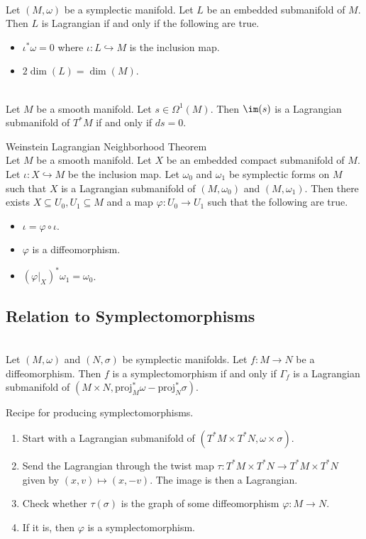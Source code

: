 \documentclass[a4paper]{article}
\begin{document}
\begin{lmm}{}{}\\
Let $(M,\omega)$ be a symplectic manifold. Let $L$ be an embedded submanifold of $M$. Then $L$ is Lagrangian if and only if the following are true. 
\begin{itemize}
\item $\iota^\ast\omega=0$ where $\iota:L\hookrightarrow M$ is the inclusion map. 
\item $2\dim(L)=\dim(M)$. 
\end{itemize}
\end{lmm}

\begin{prp}{}{}\\
Let $M$ be a smooth manifold. Let $s\in\Omega^1(M)$. Then $\im(s)$ is a Lagrangian submanifold of $T^\ast M$ if and only if $ds=0$. 
\end{prp}

\begin{thm}{Weinstein Lagrangian Neighborhood Theorem}{}\\
Let $M$ be a smooth manifold. Let $X$ be an embedded compact submanifold of $M$. Let $\iota:X\hookrightarrow M$ be the inclusion map. Let $\omega_0$ and $\omega_1$ be symplectic forms on $M$ such that $X$ is a Lagrangian submanifold of $(M,\omega_0)$ and $(M,\omega_1)$. Then there exists $X\subseteq U_0,U_1\subseteq M$ and a map $\varphi:U_0\to U_1$ such that the following are true. 
\begin{itemize}
\item $\iota=\varphi\circ\iota$. 
\item $\varphi$ is a diffeomorphism. 
\item $(\varphi|_X)^\ast\omega_1=\omega_0$. 
\end{itemize}
\end{thm}

\subsection{Relation to Symplectomorphisms}
\begin{prp}{}{}\\
Let $(M,\omega)$ and $(N,\sigma)$ be symplectic manifolds. Let $f:M\to N$ be a diffeomorphism. Then $f$ is a symplectomorphism if and only if $\Gamma_f$ is a Lagrangian submanifold of $(M\times N,\text{proj}_M^\ast\omega-\text{proj}_N^\ast\sigma)$. 
\end{prp}

Recipe for producing symplectomorphisms. 
\begin{enumerate}
\item Start with a Lagrangian submanifold of $(T^\ast M\times T^\ast N,\omega\times\sigma)$. 
\item Send the Lagrangian through the twist map $\tau:T^\ast M\times T^\ast N\to T^\ast M\times T^\ast N$ given by $(x,v)\mapsto(x,-v)$. The image is then a Lagrangian. 
\item Check whether $\tau(\sigma)$ is the graph of some diffeomorphism $\varphi:M\to N$. 
\item If it is, then $\varphi$ is a symplectomorphism. 
\end{enumerate}
\end{document}
